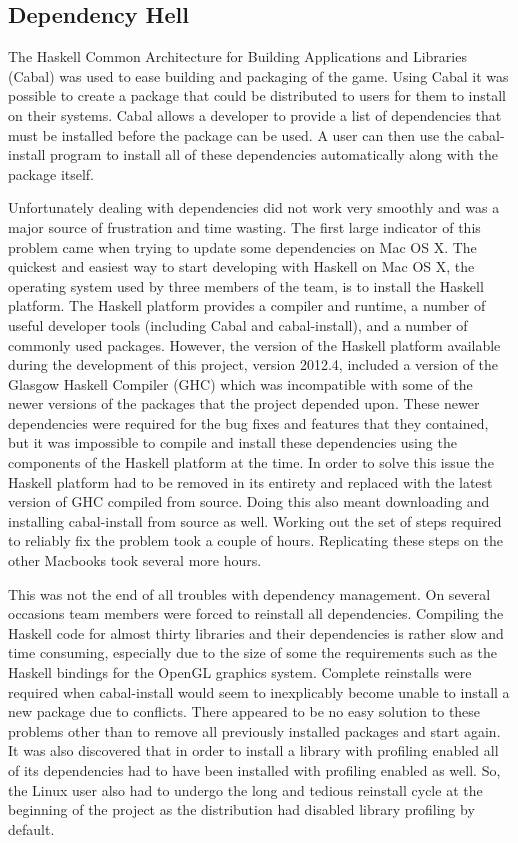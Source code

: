 \subsection{Dependency Hell}

The Haskell Common Architecture for Building Applications and Libraries (Cabal) was used to ease
building and packaging of the game. Using Cabal it was possible to create a package that could be
distributed to users for them to install on their systems. Cabal allows a developer to provide a
list of dependencies that must be installed before the package can be used. A user can then use
the cabal-install program to install all of these dependencies automatically along with the package
itself.

Unfortunately dealing with dependencies did not work very smoothly and was a major source of
frustration and time wasting. The first large indicator of this problem came when trying to
update some dependencies on Mac OS X. The quickest and easiest way to start developing with Haskell on
Mac OS X, the operating system used by three members of the team, is to install the Haskell platform.
The Haskell platform provides a compiler and runtime, a number of useful developer tools (including
Cabal and cabal-install), and a number of commonly used packages. However, the version of the
Haskell platform available during the development of this project, version 2012.4, included a
version of the Glasgow Haskell Compiler (GHC) which was incompatible with some of the newer
versions of the packages that the project depended upon. These newer dependencies were required
for the bug fixes and features that they contained, but it was impossible to compile and install
these dependencies using the components of the Haskell platform at the time. In order to solve
this issue the Haskell platform had to be removed in its entirety and replaced with the latest
version of GHC compiled from source. Doing this also meant downloading and installing cabal-install
from source as well. Working out the set of steps required to reliably fix the problem took
a couple of hours. Replicating these steps on the other Macbooks took several more hours.

This was not the end of all troubles with dependency management. On several occasions team
members were forced to reinstall all dependencies. Compiling the Haskell code for almost thirty
libraries and their dependencies is rather slow and time consuming, especially due to the size
of some the requirements such as the Haskell bindings for the OpenGL graphics system.
Complete reinstalls were required when cabal-install would seem to inexplicably become unable
to install a new package due to conflicts. There appeared to be no easy solution to these
problems other than to remove all previously installed packages and start again. It was also
discovered that in order to install a library with profiling enabled all of its dependencies
had to have been installed with profiling enabled as well. So, the Linux user also had to
undergo the long and tedious reinstall cycle at the beginning of the project as the distribution
had disabled library profiling by default.
